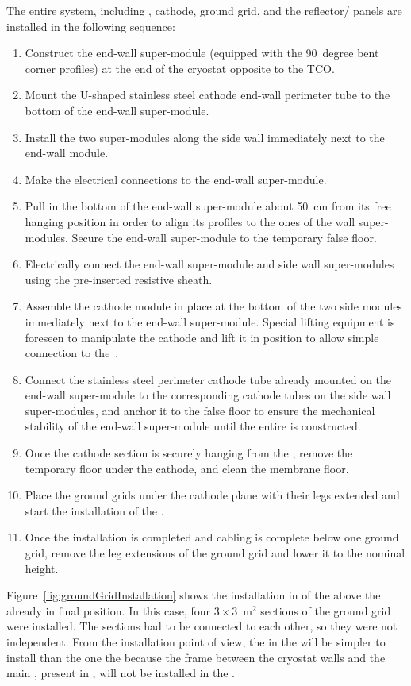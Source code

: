The entire  system, including , cathode, ground grid, and the reflector/ panels are installed in the following sequence:
\begin{enumerate}
\item Construct the end-wall super-module (equipped with the 90~degree bent corner profiles) at the end of the cryostat opposite to the TCO.
\item Mount the U-shaped stainless steel cathode end-wall perimeter tube to the bottom of the end-wall super-module.
\item Install the two super-modules along the side wall immediately next to the end-wall module.
\item Make the electrical connections to the end-wall super-module.
\item Pull in the bottom of the end-wall super-module about 50~cm from its free hanging position in order to align its profiles to the ones of the wall  super-modules. Secure the end-wall super-module to the temporary false floor.
\item Electrically connect the end-wall super-module and side wall super-modules using the pre-inserted resistive sheath.
\item Assemble the cathode module in place at the bottom of the two side  modules immediately next to the end-wall super-module.
Special lifting equipment is foreseen to manipulate the cathode and lift it in position to allow simple connection to the~.
\item Connect the stainless steel perimeter cathode tube already mounted on the end-wall super-module to the corresponding cathode tubes on the side wall super-modules, and anchor it to the false floor to ensure the mechanical stability of the end-wall super-module until the entire  is constructed.
\item Once the cathode section is securely hanging from the , remove the temporary floor under the cathode, and clean the membrane floor.
\item Place the ground grids under the cathode plane with their legs extended and start the installation of the .
\item Once the  installation is completed and cabling is complete below one ground grid, remove the leg extensions of the ground grid and lower it to the nominal height.
\end{enumerate}
Figure~\ref{fig:groundGridInstallation} shows the installation in  of the   above the  already in final position.
In this case, four $3 \times 3$~m$^2$ sections of the ground grid were installed.
The sections had to be connected to each other, so they were not independent.
From the installation point of view, the  in the  will be simpler to install than the one the   because the  frame between the cryostat walls and the main , present in , will not be installed in the .

